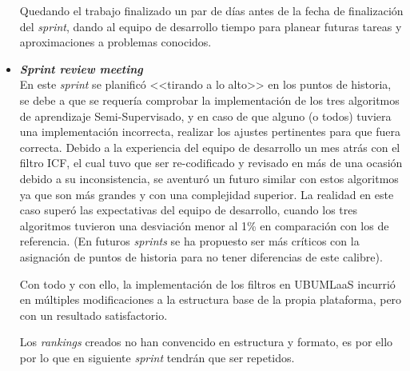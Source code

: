 \begin{itemize}
Quedando el trabajo finalizado un par de días antes de la fecha de finalización del \textit{sprint}, dando al equipo de desarrollo tiempo para planear futuras tareas y aproximaciones a problemas conocidos.

\item \textbf{\textit{Sprint review meeting}}\\
En este \textit{sprint} se planificó <<tirando a lo alto>> en los puntos de historia, se debe a que se requería comprobar la implementación de los tres algoritmos de aprendizaje Semi-Supervisado, y en caso de que alguno (o todos) tuviera una implementación incorrecta, realizar los ajustes pertinentes para que fuera correcta. Debido a la experiencia del equipo de desarrollo un mes atrás con el filtro ICF, el cual tuvo que ser re-codificado y revisado en más de una ocasión debido a su inconsistencia, se aventuró un futuro similar con estos algoritmos ya que son más grandes y con una complejidad superior. La realidad en este caso superó las expectativas del equipo de desarrollo, cuando los tres algoritmos tuvieron una desviación menor al 1\% en comparación con los de referencia. (En futuros \textit{sprints} se ha propuesto ser más críticos con la asignación de puntos de historia para no tener diferencias de este calibre).

Con todo y con ello, la implementación de los filtros en UBUMLaaS incurrió en múltiples modificaciones a la estructura base de la propia plataforma, pero con un resultado satisfactorio.

Los \textit{rankings} creados no han convencido en estructura y formato, es por ello por lo que en siguiente \textit{sprint} tendrán que ser repetidos.
\end{itemize}

